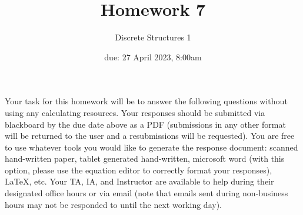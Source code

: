\documentclass[11pt, oneside]{article}   	%
\title{Homework 7}
\author{Discrete Structures 1}
\date{due: 27 April 2023, 8:00am}							%
\begin{document}
\maketitle

Your task for this homework will be to answer the following questions without using any calculating resources. 
Your responses should be submitted via blackboard by the due date above as a PDF (submissions in any other format will be returned to the user and a resubmissions will be requested). 
You are free to use whatever tools you would like to generate the response document: 
scanned hand-written paper, 
tablet generated hand-written, 
microsoft word (with this option, please use the equation editor to correctly format your responses), 
\LaTeX, etc.
Your TA, IA, and Instructor are available to help during their designated office hours or via email 
(note that emails sent during non-business hours may not be responded to until the next working day). 
\end{document}
